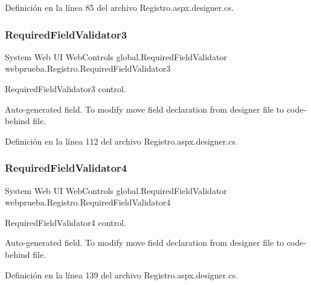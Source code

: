Definición en la línea 85 del archivo Registro.\+aspx.\+designer.\+cs.

\mbox{\label{classwebprueba_1_1_registro_aed53b72bb233e204df669ead11bbc782}} 
\subsubsection{\texorpdfstring{RequiredFieldValidator3}{RequiredFieldValidator3}}
{\footnotesize\ttfamily System Web UI Web\+Controls global.\+Required\+Field\+Validator webprueba.\+Registro.\+Required\+Field\+Validator3\hspace{0.3cm}{\ttfamily [protected]}}



Required\+Field\+Validator3 control. 

Auto-\/generated field. To modify move field declaration from designer file to code-\/behind file. 

Definición en la línea 112 del archivo Registro.\+aspx.\+designer.\+cs.

\mbox{\label{classwebprueba_1_1_registro_ae120f3a2f6af2cc1b45c4f74b401880f}} 
\subsubsection{\texorpdfstring{RequiredFieldValidator4}{RequiredFieldValidator4}}
{\footnotesize\ttfamily System Web UI Web\+Controls global.\+Required\+Field\+Validator webprueba.\+Registro.\+Required\+Field\+Validator4\hspace{0.3cm}{\ttfamily [protected]}}



Required\+Field\+Validator4 control. 

Auto-\/generated field. To modify move field declaration from designer file to code-\/behind file. 

Definición en la línea 139 del archivo Registro.\+aspx.\+designer.\+cs.

\mbox{\label{classwebprueba_1_1_registro_a3d2be0ece74dedad7ab74b7212b7fa3b}} 
